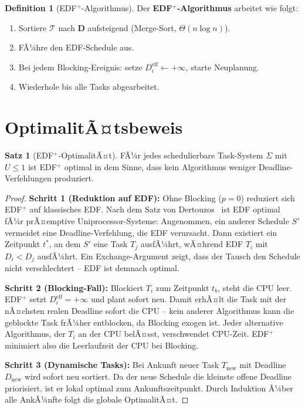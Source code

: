 ﻿\documentclass[a4paper,12pt]{scrreprt}
\theoremstyle{definition}
\newtheorem{definition}{Definition}[chapter]
\newtheorem{satz}{Satz}[chapter]
\begin{document}
	\begin{definition}[EDF$^+$-Algorithmus]\label{def:edfplus}
		Der \textbf{EDF$^+$-Algorithmus} arbeitet wie folgt:
		\begin{enumerate}
			\item Sortiere $\mathcal{T}$ nach $\mathbf{D}$ aufsteigend
			(Merge-Sort, $\Theta(n \log n)$).
			\item FÃ¼hre den EDF-Schedule aus.
			\item Bei jedem Blocking-Ereignis: setze $D_i^{\mathrm{eff}} \leftarrow +\infty$,
			starte Neuplanung.
			\item Wiederhole bis alle Tasks abgearbeitet.
		\end{enumerate}
	\end{definition}
	
	\section{OptimalitÃ¤tsbeweis}
	
	\begin{satz}[EDF$^+$-OptimalitÃ¤t]\label{satz:edfopt}
		FÃ¼r jedes schedulierbare Task-System $\Sigma$ mit $U \leq 1$ ist
		EDF$^+$ optimal in dem Sinne, dass kein Algorithmus weniger
		Deadline-Verfehlungen produziert.
	\end{satz}
	
	\begin{proof}
		\textbf{Schritt 1 (Reduktion auf EDF):} Ohne Blocking ($p = 0$) reduziert
		sich EDF$^+$ auf klassisches EDF. Nach dem Satz von Dertouzos~\cite{Dertouzos1974}
		ist EDF optimal fÃ¼r prÃ¤emptive Uniprocessor-Systeme: Angenommen, ein
		anderer Schedule $S'$ vermeidet eine Deadline-Verfehlung, die EDF verursacht.
		Dann existiert ein Zeitpunkt $t^*$, an dem $S'$ eine Task $T_j$ ausfÃ¼hrt,
		wÃ¤hrend EDF $T_i$ mit $D_i < D_j$ ausfÃ¼hrt. Ein Exchange-Argument zeigt,
		dass der Tausch den Schedule nicht verschlechtert -- EDF ist demnach optimal.
		
		\textbf{Schritt 2 (Blocking-Fall):} Blockiert $T_i$ zum Zeitpunkt $t_b$,
		steht die CPU leer. EDF$^+$ setzt $D_i^{\mathrm{eff}} = +\infty$ und
		plant sofort neu. Damit erhÃ¤lt die Task mit der nÃ¤chsten realen Deadline
		sofort die CPU -- kein anderer Algorithmus kann die geblockte Task frÃ¼her
		entblocken, da Blocking exogen ist. Jeder alternative Algorithmus, der
		$T_i$ an der CPU belÃ¤sst, verschwendet CPU-Zeit. EDF$^+$ minimiert also
		die Leer\-laufzeit der CPU bei Blocking.
		
		\textbf{Schritt 3 (Dynamische Tasks):} Bei Ankunft neuer Task $T_{\text{new}}$
		mit Deadline $D_{\text{new}}$ wird sofort neu sortiert. Da der neue Schedule
		die kleinste offene Deadline priorisiert, ist er lokal optimal zum
		Ankunftszeitpunkt. Durch Induktion Ã¼ber alle AnkÃ¼nfte folgt die globale
		OptimalitÃ¤t.
	\end{proof}
	
\end{document}
